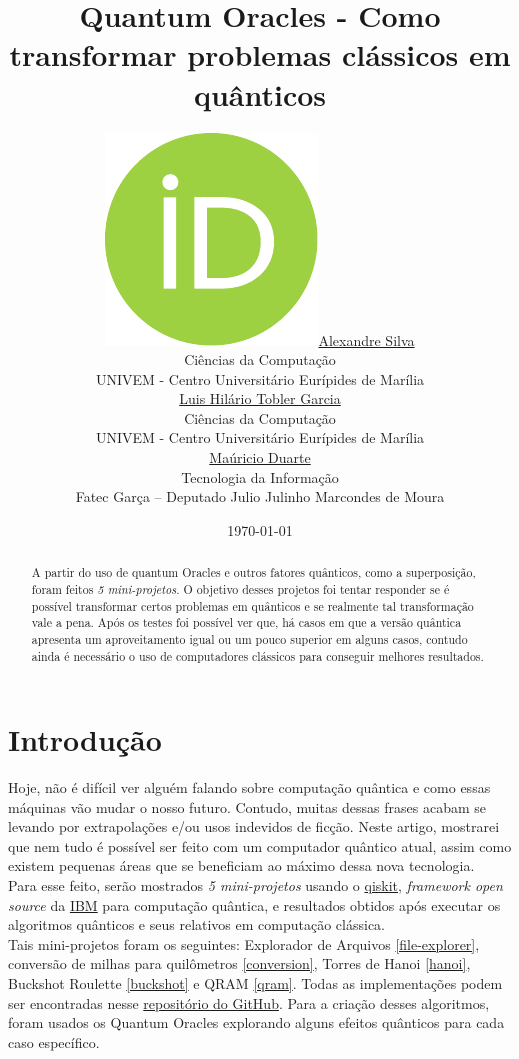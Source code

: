 \documentclass{article}
\title{Quantum Oracles - Como transformar problemas clássicos em quânticos}
\date{\today}
\author{ 
	\href{https://orcid.org/0009-0008-9134-5974}{\includegraphics[scale=0.06]{orcid.pdf}\hspace{1mm}Alexandre Silva}\\
	Ciências da Computação\\
	UNIVEM - Centro Universitário Eurípides de Marília\\
	\And
	\href{http://lattes.cnpq.br/5170103189904688}{\hspace{1mm}Luis Hilário Tobler Garcia} \\
	Ciências da Computação\\
	UNIVEM - Centro Universitário Eurípides de Marília\\
	\And
	\href{http://lattes.cnpq.br/7265559606596355}{\hspace{1mm}Maúricio Duarte} \\
	Tecnologia da Informação \\
	Fatec Garça – Deputado Julio Julinho Marcondes de Moura\\
}
\begin{document}
\maketitle
\begin{abstract}
	A partir do uso de quantum Oracles e outros fatores quânticos, como a superposição, foram feitos \emph{5 mini-projetos}. O objetivo desses projetos foi tentar responder se é possível transformar certos problemas em quânticos e se realmente tal transformação vale a pena. Após os testes foi possível ver que, há casos em que a versão quântica apresenta um aproveitamento igual ou um pouco superior em alguns casos, contudo ainda é necessário o uso de computadores clássicos para conseguir melhores resultados.
\end{abstract}


\section{Introdução}
Hoje, não é difícil ver alguém falando sobre computação quântica e como essas máquinas vão mudar o nosso futuro. Contudo, muitas dessas frases acabam se levando por extrapolações e/ou usos indevidos de ficção. Neste artigo, mostrarei que nem tudo é possível ser feito com um computador quântico atual, assim como existem pequenas áreas que se beneficiam ao máximo dessa nova tecnologia.\\
Para esse feito, serão mostrados \emph{5 mini-projetos} usando o \href{https://www.ibm.com/quantum/qiskit}{qiskit}, \emph{framework open source} da \href{https://www.ibm.com/}{IBM} para computação quântica, e resultados obtidos após executar os algoritmos quânticos e seus relativos em computação clássica.\\
Tais mini-projetos foram os seguintes: Explorador de Arquivos \ref{file-explorer}, conversão de milhas para quilômetros \ref{conversion}, Torres de Hanoi \ref{hanoi}, Buckshot Roulette \ref{buckshot} e QRAM \ref{qram}. Todas as implementações podem ser encontradas nesse  \href{https://github.com/Dpbm/scientific-initiation-1-quantum-oracles}{repositório do GitHub}.
Para a criação desses algoritmos, foram usados os Quantum Oracles explorando alguns efeitos quânticos para cada caso específico. 
\end{document}

